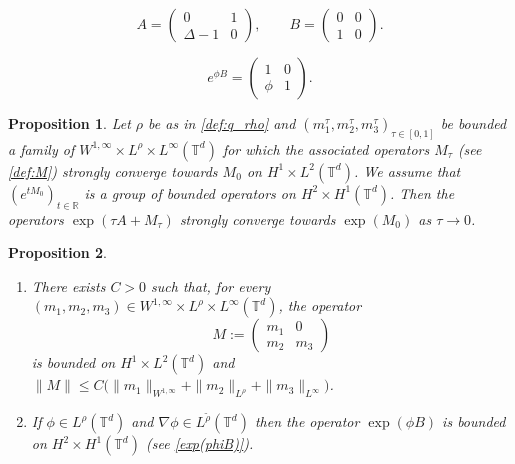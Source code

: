 \documentclass[10pt,a4paper]{amsart}
\newtheorem{proposition}{Proposition}
\newcommand{\R}{\mathbb{R}}
\newcommand{\T}{\mathbb{T}}
\begin{document}
\begin{equation} \label{def:B}
A=\begin{pmatrix}
    0 & 1 \\ \Delta-1 & 0
\end{pmatrix},
\qquad
B=\begin{pmatrix}
    0 & 0 \\ 1 & 0
\end{pmatrix}.
\end{equation}

\begin{equation} \label{exp(phiB)}
e^{\phi B}=\begin{pmatrix}
    1 & 0 \\ \phi & 1 
\end{pmatrix}. 
\end{equation}

\begin{proposition} \label{Lem:strongCV}
Let $\rho$ be as in \eqref{def:q_rho} and $(m_1^{\tau},m_2^{\tau},m_3^{\tau})_{\tau \in [0,1]}$ be bounded a family of $W^{1,\infty} \times L^{\rho} \times L^{\infty}(\mathbb{T}^d)$ for which the associated operators $M_{\tau}$ (see \eqref{def:M}) strongly converge towards $M_0$ on $H^1 \times L^2(\T^d)$. We assume that $(e^{tM_0})_{t\in\R}$ is a group of bounded operators on $H^2 \times H^1(\T^d)$. Then the operators
$\exp(\tau A + M_{\tau})$ 
strongly converge towards 
$\exp(M_0)$ as $\tau \to 0$.
\end{proposition}

\begin{proposition} \label{Lem:M}
\begin{enumerate}[topsep=0cm, parsep=0cm, itemsep=0cm]
\item There exists $C>0$ such that, for every
$(m_1,m_2,m_3) \in  W^{1,\infty} \times L^{\rho} \times L^{\infty}(\mathbb{T}^d)$, the operator
\begin{equation} \label{def:M}
M:=\begin{pmatrix}
 m_{1} & 0 \\
 m_{2} & m_{3}
 \end{pmatrix}
\end{equation}
is bounded on $H^1 \times L^2(\T^d)$ and 
$\|M\| \leq C \big( \|m_1\|_{W^{1,\infty}}+\|m_{2}\|_{L^{\rho}}+\|m_{3}\|_{L^{\infty}} \big)$.
%
\item If $\phi \in L^{\rho}(\T^d)$ and $\nabla \phi \in L^{\widetilde{\rho}}(\T^d)$ then the operator
$\exp(\phi B)$ is bounded on $H^2 \times H^1(\T^d)$ (see \eqref{exp(phiB)}).
\end{enumerate}
\end{proposition} 
\end{document}
